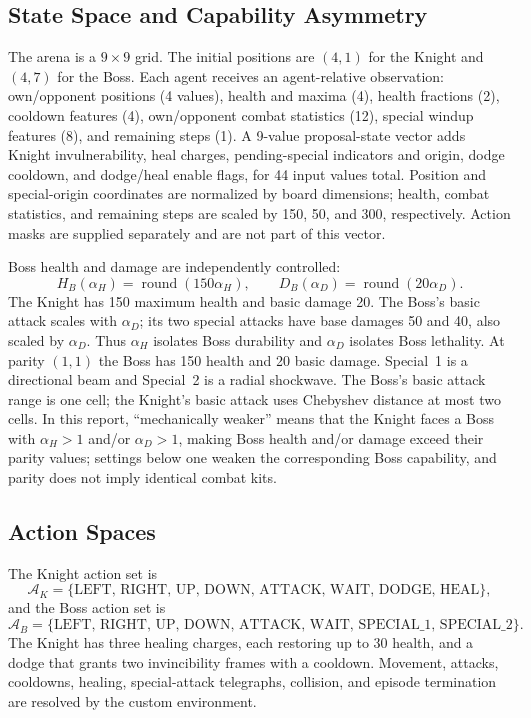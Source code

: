\documentclass{article}
\begin{document}
\subsection{State Space and Capability Asymmetry}
The arena is a $9\times9$ grid. The initial positions are $(4,1)$ for the Knight and $(4,7)$ for the Boss. Each agent receives an agent-relative observation: own/opponent positions (4 values), health and maxima (4), health fractions (2), cooldown features (4), own/opponent combat statistics (12), special windup features (8), and remaining steps (1). A 9-value proposal-state vector adds Knight invulnerability, heal charges, pending-special indicators and origin, dodge cooldown, and dodge/heal enable flags, for 44 input values total. Position and special-origin coordinates are normalized by board dimensions; health, combat statistics, and remaining steps are scaled by 150, 50, and 300, respectively. Action masks are supplied separately and are not part of this vector.

Boss health and damage are independently controlled:
\begin{equation}
H_B(\alpha_H)=\operatorname{round}(150\alpha_H),\qquad
D_B(\alpha_D)=\operatorname{round}(20\alpha_D).
\end{equation}
The Knight has 150 maximum health and basic damage 20. The Boss's basic attack scales with $\alpha_D$; its two special attacks have base damages 50 and 40, also scaled by $\alpha_D$. Thus $\alpha_H$ isolates Boss durability and $\alpha_D$ isolates Boss lethality. At parity $(1,1)$ the Boss has 150 health and 20 basic damage. Special~1 is a directional beam and Special~2 is a radial shockwave. The Boss's basic attack range is one cell; the Knight's basic attack uses Chebyshev distance at most two cells. In this report, ``mechanically weaker'' means that the Knight faces a Boss with $\alpha_H>1$ and/or $\alpha_D>1$, making Boss health and/or damage exceed their parity values; settings below one weaken the corresponding Boss capability, and parity does not imply identical combat kits.

\subsection{Action Spaces}
The Knight action set is
\begin{equation}
\mathcal{A}_K=\{\text{LEFT, RIGHT, UP, DOWN, ATTACK, WAIT, DODGE, HEAL}\},
\end{equation}
and the Boss action set is
\begin{equation}
\mathcal{A}_B=\{\text{LEFT, RIGHT, UP, DOWN, ATTACK, WAIT, SPECIAL\_1, SPECIAL\_2}\}.
\end{equation}
The Knight has three healing charges, each restoring up to 30 health, and a dodge that grants two invincibility frames with a cooldown. Movement, attacks, cooldowns, healing, special-attack telegraphs, collision, and episode termination are resolved by the custom environment.
\end{document}
